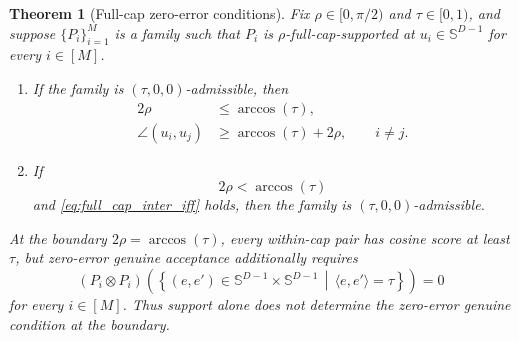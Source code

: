 \documentclass[10pt,a4paper]{amsart}
\newtheorem{theorem}{Theorem}
\begin{document}
\begin{theorem}[Full-cap zero-error conditions]
\label{thm:full_cap_iff}
%
Fix $\rho\in[0,\pi/2)$ and $\tau\in[0,1)$, and suppose $\{P_i\}_{i=1}^M$ is a family such that $P_i$ is $\rho$-full-cap-supported at $u_i\in\mathbb S^{D-1}$ for every $i\in[M]$.
%
\begin{enumerate}
%
\item If the family is $(\tau,0,0)$-admissible, then
%
\begin{align}
2\rho &\le \arccos(\tau),
\label{eq:full_cap_intra_iff}\\
\angle(u_i,u_j) &\ge \arccos(\tau)+2\rho, \qquad i\ne j.
\label{eq:full_cap_inter_iff}
\end{align}
%
\item If
%
\begin{equation}
2\rho<\arccos(\tau)
\label{eq:full_cap_intra_suff}
\end{equation}
%
and \eqref{eq:full_cap_inter_iff} holds, then the family is $(\tau,0,0)$-admissible.
%
\end{enumerate}
%
At the boundary $2\rho=\arccos(\tau)$, every within-cap pair has cosine score at least $\tau$, but zero-error genuine acceptance additionally requires
%
\begin{equation}
(P_i\otimes P_i) \left( \left\{ (e,e')\in \mathbb S^{D-1}\times\mathbb S^{D-1} \,\middle|\,
\langle e,e'\rangle=\tau \right\} \right) =0
\end{equation}
%
for every $i\in[M]$. Thus support alone does not determine the zero-error genuine condition at the boundary.
%
\end{theorem}
\end{document}
